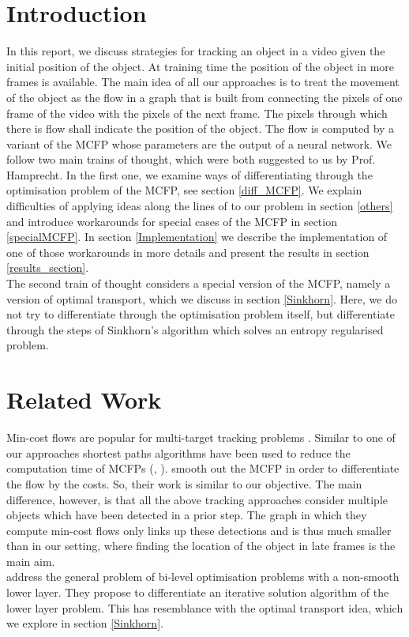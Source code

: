 \documentclass{article}
\begin{document}
\section{Introduction}
In this report, we discuss strategies for tracking an object in a video given the initial position of the object. At training time the position of the object in more frames is available. The main idea of all our approaches is to treat the movement of the object as the flow in a graph that is built from connecting the pixels of one frame of the video with the pixels of the next frame. The pixels through which there is flow shall indicate the position of the object. The flow is computed by a variant of the MCFP whose parameters are the output of a neural network. We follow two main trains of thought, which were both suggested to us by Prof. Hamprecht. In the first one, we examine ways of differentiating through the optimisation problem of the MCFP, see section \ref{diff_MCFP}. We explain difficulties of applying ideas along the lines of \cite{AmosK17} to our problem in section \ref{others} and introduce workarounds for special cases of the MCFP in section \ref{specialMCFP}. In section \ref{Implementation} we describe the implementation of one of those workarounds in more details and present the results in section \ref{results_section}.\\
The second train of thought considers a special version of the MCFP, namely a version of optimal transport, which we discuss in section \ref{Sinkhorn}. Here, we do not try to differentiate through the optimisation problem itself, but differentiate through the steps of Sinkhorn's algorithm which solves an entropy regularised problem.

\section{Related Work}
Min-cost flows are popular for multi-target tracking problems \cite{zha08}. Similar to one of our approaches shortest paths algorithms have been used to reduce the computation time of MCFPs (\cite{ber11}, \cite{lenz15}). \cite{sch17} smooth out the MCFP in order to differentiate the flow by the costs. So, their work is similar to our objective. The main difference, however, is that all the above tracking approaches consider multiple objects which have been detected in a prior step. The graph in which they compute min-cost flows only links up these detections and is thus much smaller than in our setting, where finding the location of the object in late frames is the main aim.\\
\cite{ochs15} address the general problem of bi-level optimisation problems with a non-smooth lower layer. They propose to differentiate an iterative solution algorithm of the lower layer problem. This has resemblance with the optimal transport idea, which we explore in section \ref{Sinkhorn}. 
\end{document}
